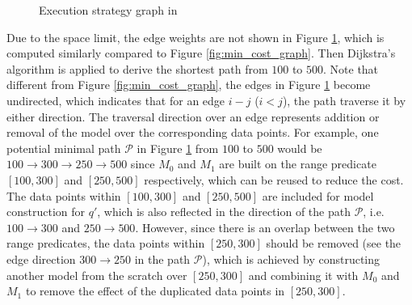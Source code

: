 \begin{figure}[t]
\begin{center}
\end{center}
\caption{Execution strategy graph in \cite{gupta2015processing}}
\label{fig:min_cost_graph2}
\end{figure}

Due to the space limit, the edge weights are not shown in Figure \ref{fig:min_cost_graph2}, which is computed similarly compared to Figure \ref{fig:min_cost_graph}. Then Dijkstra's algorithm is applied to derive the shortest path from $100$ to $500$. Note that different from Figure \ref{fig:min_cost_graph}, the edges in Figure \ref{fig:min_cost_graph2} become undirected, which indicates that for an edge $i-j$ ($i < j$), the path traverse it by either direction. The traversal direction over an edge represents addition or removal of the model over the corresponding data points. For example, one potential minimal path $\mathcal{P}$ in Figure \ref{fig:min_cost_graph2} from $100$ to $500$ would be $100\rightarrow 300 \rightarrow 250 \rightarrow 500$ since $M_0$ and $M_1$ are built on the range predicate $[100, 300]$ and $[250, 500]$ respectively, which can be reused to reduce the cost. The data points within $[100, 300]$ and $[250, 500]$ are included for model construction for $q'$, which is also reflected in the direction of the path $\mathcal{P}$, i.e. $100 \rightarrow 300$ and $250 \rightarrow 500$. However, since there is an overlap between the two range predicates, the data points within $[250, 300]$ should be removed (see the edge direction $300\rightarrow250$ in the path $\mathcal{P}$), which is achieved by constructing another model from the scratch over $[250, 300]$ and combining it with $M_0$ and $M_1$ to remove the effect of the duplicated data points in $[250, 300]$.

